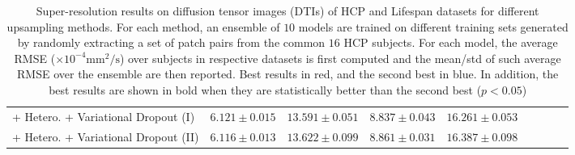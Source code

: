\begin{table}
\begin{tabular}{@{}lclclclcl}
		+ Hetero. + Variational Dropout (I)   & \cellcolor{blue!15} $6.121\pm0.015$    &$13.591\pm0.051$   & \cellcolor{red!15} $8.837\pm0.043$ &$16.261\pm0.053$\\ 
		+ Hetero. + Variational Dropout (II)  & \cellcolor{red!15} $6.116\pm0.013$   &$13.622\pm0.099$   & \cellcolor{blue!15} $8.861\pm0.031$  &$16.387\pm0.098$\\
		\hline
	\end{tabular}%
	\vspace{-1mm}
\caption{\footnotesize Super-resolution results on diffusion tensor images (DTIs) of HCP and Lifespan datasets for different upsampling methods. For each method, an ensemble of $10$ models are trained on different training sets generated by randomly extracting a set of patch pairs from the common $16$ HCP subjects. For each model, the average RMSE ($\times 10^{-4} \text{mm}^2/\text{s} $) over subjects in respective datasets is first computed and the mean/std of such average RMSE over the ensemble are then reported. Best results in red, and the second best in blue. In addition, the best results are shown in bold when they are statistically better than the second best ($p < 0.05$)}
\label{tab:compare_1}	
\end{table}

